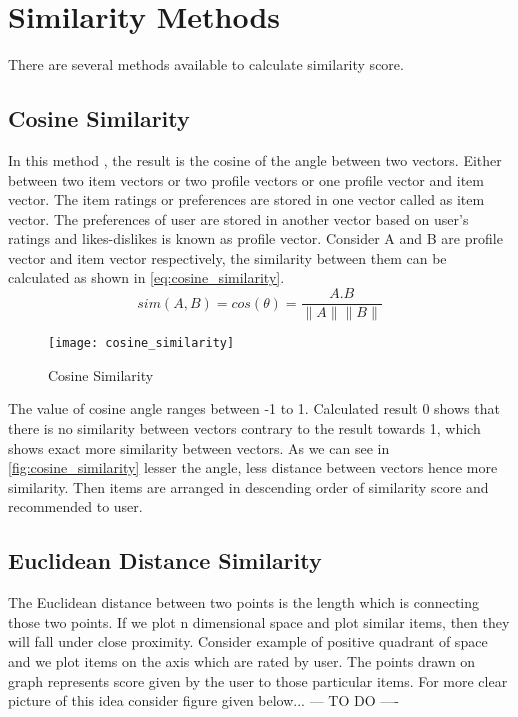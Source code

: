 
\section{Similarity Methods}
\label{similarity_methods}
There are several methods available to calculate similarity score.
\\

\subsection{Cosine Similarity}
\label{cosine_similarity}
In this method \cite{19}, the result is the cosine of the angle between two vectors. Either between two item vectors or two profile vectors or one profile vector and item vector. The item ratings or preferences are stored in one vector called as item vector. The preferences of user are stored in another vector based on user's ratings and likes-dislikes is known as profile vector. Consider A and B are profile vector and item vector respectively, the similarity between them can be calculated as shown in \autoref{eq:cosine_similarity}.
\\

\begin{equation}
sim(A,B) = cos(\theta) =\frac {A.B}{\parallel A \parallel \parallel B \parallel}
\label{eq:cosine_similarity}
\end{equation}

\begin{figure}[H]
	\centering
	\texttt{[image: cosine\_similarity]}
	\caption{Cosine Similarity}
	\label{fig:cosine_similarity}
\end{figure}

\noindent The value of cosine angle ranges between -1 to 1. Calculated result 0 shows that there is no similarity between vectors contrary to the result towards 1, which shows exact more similarity between vectors. As we can see in \autoref{fig:cosine_similarity} lesser the angle, less distance between vectors hence more similarity. Then items are arranged in descending order of similarity score and recommended to user.
\\
\subsection{Euclidean Distance Similarity}
\label{euclidean_distance}
The Euclidean distance between two points is the length which is connecting those two points. If we plot n dimensional space and plot similar items, then they will fall under close proximity. Consider example of positive quadrant of space and we plot items on the axis which are rated by user. The points drawn on graph represents score given by the user to those particular items. For more clear picture of this idea consider figure given below...
--- TO DO ----

